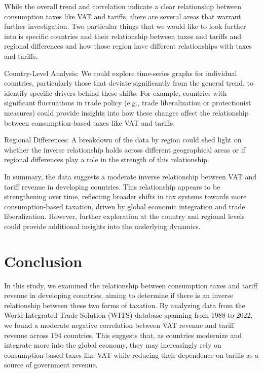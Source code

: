 \documentclass[12pt]{article}
\begin{document}
While the overall trend and correlation indicate a clear relationship between consumption taxes like VAT and tariffs, there are several areas that warrant further investigation. Two particular things that we would like to look further into is specific countries and their relationship between taxes and tariffs and regional differences and how those region have different relationships with taxes and tariffs.

Country-Level Analysis: We could explore time-series graphs for individual countries, particularly those that deviate significantly from the general trend, to identify specific drivers behind these shifts. For example, countries with significant fluctuations in trade policy (e.g., trade liberalization or protectionist measures) could provide insights into how these changes affect the relationship between consumption-based taxes like VAT and tariffs.

Regional Differences: A breakdown of the data by region could shed light on whether the inverse relationship holds across different geographical areas or if regional differences play a role in the strength of this relationship.

In summary, the data suggests a moderate inverse relationship between VAT and tariff revenue in developing countries. This relationship appears to be strengthening over time, reflecting broader shifts in tax systems towards more consumption-based taxation, driven by global economic integration and trade liberalization. However, further exploration at the country and regional levels could provide additional insights into the underlying dynamics.

\section{Conclusion}
\label{sec:conclusion}

In this study, we examined the relationship between consumption taxes and tariff revenue in developing countries, aiming to determine if there is an inverse relationship between these two forms of taxation. By analyzing data from the World Integrated Trade Solution (WITS) database spanning from 1988 to 2022, we found a moderate negative correlation between VAT revenue and tariff revenue across 194 countries. This suggests that, as countries modernize and integrate more into the global economy, they may increasingly rely on consumption-based taxes like VAT while reducing their dependence on tariffs as a source of government revenue.
\end{document}
